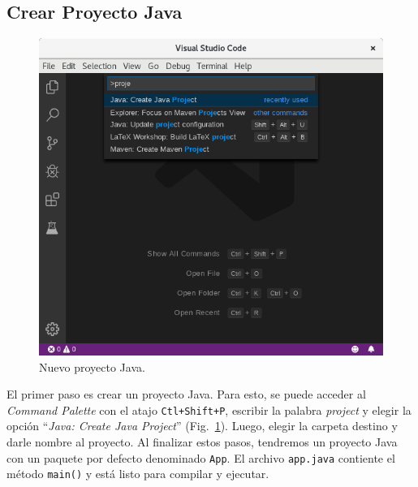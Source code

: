 \documentclass[a5paper,10pt]{article}
\begin{document}
\subsection{Crear Proyecto Java}
\label{proyecto_java}

\begin{figure}[t]
	\centering
	\includegraphics[width=.95\textwidth]{img/NuevoProyecto}
	\caption{Nuevo proyecto Java.}
	\label{maven_nuevo}
\end{figure}


El primer paso es crear un proyecto Java.  Para esto, se puede acceder al \emph{Command Palette} con el atajo \verb|Ctl+Shift+P|, escribir la palabra \emph{project} y elegir la opción ``\emph{Java: Create Java Project}'' (Fig.~\ref{maven_nuevo}). Luego, elegir la carpeta destino y darle nombre al proyecto.  Al finalizar estos pasos, tendremos un proyecto Java con un paquete por defecto denominado \verb|App|.  El archivo \verb|app.java| contiente el método \verb|main()| y está listo para compilar y ejecutar.
\end{document}
